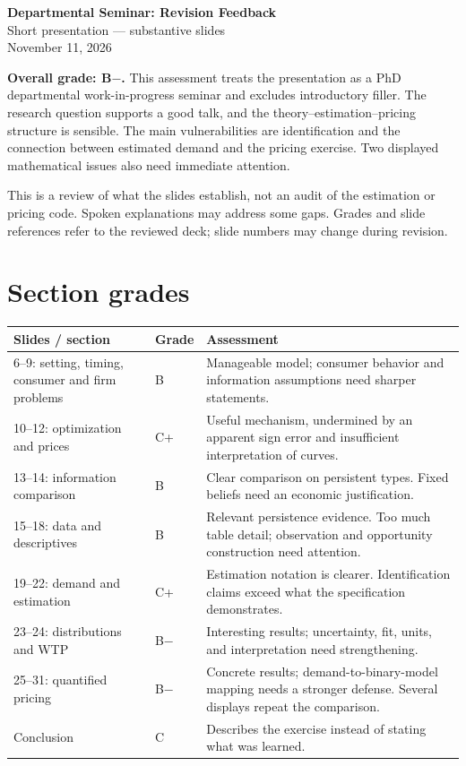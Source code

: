 \documentclass[11pt]{article}
\begin{document}
\begin{center}
{\LARGE\bfseries Departmental Seminar: Revision Feedback}\\[5pt]
{\large Short presentation --- substantive slides}\\[3pt]
November 11, 2026
\end{center}

\textbf{Overall grade: B$-$.} This assessment treats the presentation as a PhD departmental work-in-progress seminar and excludes introductory filler. The research question supports a good talk, and the theory--estimation--pricing structure is sensible. The main vulnerabilities are identification and the connection between estimated demand and the pricing exercise. Two displayed mathematical issues also need immediate attention.

This is a review of what the slides establish, not an audit of the estimation or pricing code. Spoken explanations may address some gaps. Grades and slide references refer to the reviewed deck; slide numbers may change during revision.

\section{Section grades}
\small
\begin{tabularx}{\textwidth}{@{}p{}p{}X@{}}
\toprule
Slides / section & Grade & Assessment \\
\midrule
6--9: setting, timing, consumer and firm problems & B & Manageable model; consumer behavior and information assumptions need sharper statements.\\[5pt]
10--12: optimization and prices & C+ & Useful mechanism, undermined by an apparent sign error and insufficient interpretation of curves.\\[5pt]
13--14: information comparison & B & Clear comparison on persistent types. Fixed beliefs need an economic justification.\\[5pt]
15--18: data and descriptives & B & Relevant persistence evidence. Too much table detail; observation and opportunity construction need attention.\\[5pt]
19--22: demand and estimation & C+ & Estimation notation is clearer. Identification claims exceed what the specification demonstrates.\\[5pt]
23--24: distributions and WTP & B$-$ & Interesting results; uncertainty, fit, units, and interpretation need strengthening.\\[5pt]
25--31: quantified pricing & B$-$ & Concrete results; demand-to-binary-model mapping needs a stronger defense. Several displays repeat the comparison.\\[5pt]
Conclusion & C & Describes the exercise instead of stating what was learned.\\
\bottomrule
\end{tabularx}
\normalsize
\end{document}
